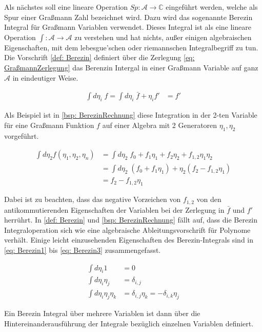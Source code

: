 Als nächstes soll eine lineare Operation $\textit{Sp}:\mathcal A \rightarrow \mathbb C$ eingeführt werden, welche als Spur einer Graßmann Zahl bezeichnet wird. Dazu wird das sogenannte Berezin Integral für Graßmann Variablen verwendet. Dieses Integral ist als eine lineare Operation $\int: \mathcal A \rightarrow \mathcal A$ zu verstehen und hat nichts, außer einigen algebraischen Eigenschaften, mit dem lebesgue'schen oder riemannschen Integralbegriff zu tun. Die Vorschrift \eqref{def: Berezin} definiert über die Zerlegung \eqref{eq: GraßmannZerlegung} das Berenzin Intergal in einer Graßmann Variable auf ganz $\mathcal A$ in eindeutiger Weise.

\begin{align} 
\int d \eta_i \; f = \int d \eta_i \; \bar{f} + \eta_i f' &= f' \label{def: Berezin}
\end{align}

\noindent Als Beispiel ist in \eqref{bsp: BerezinRechnung} diese Integration in der 2-ten Variable für eine Graßmann Funktion $f$ auf einer Algebra mit 2 Generatoren $\eta_1, \eta_2$ vorgeführt.

\begin{align} 
\int d\eta_2 f(\eta_1,\eta_2,\eta_n) &= \int d\eta_2 \; f_0 + f_1 \eta_1 + f_2 \eta_2 + f_{1,2} \eta_1 \eta_2 \nonumber \\
&= \int d\eta_2 \; (f_0 + f_1 \eta_1) + \eta_2 (f_2  - f_{1,2} \eta_1) \nonumber\\
&= f_2  - f_{1,2} \eta_1 \label{bsp: BerezinRechnung}
\end{align}

\noindent Dabei ist zu beachten, dass das negative Vorzeichen von $f_{1,2}$ von den antikommutierenden Eigenschaften der Variablen bei der Zerlegung in $\bar f$ und  $f'$ herrührt. In \eqref{def: Berezin} und \eqref{bsp: BerezinRechnung} fällt auf, dass die Berezin Integraloperation sich wie eine algebraische Ableitungsvorschrift für Polynome verhält. Einige leicht einzusehenden Eigenschaften des Berezin-Integrals sind in \eqref{eq: Berezin1} bis \eqref{eq: Berezin3} zusammengefasst.

\begin{align}
    \int d\eta_i 1 &= 0 \label{eq: Berezin1}\\
    \int d\eta_i \eta_j &= \delta_{i,j} \\
    \int d\eta_i \eta_j \eta_k &=  \delta_{i,j} \eta_k = - \delta_{i,k} \eta_j \label{eq: Berezin3}
\end{align}

\noindent Ein Berezin Integral über mehrere Variablen ist dann über die Hintereinanderausführung der Integrale bezüglich einzelnen Variablen definiert. 

